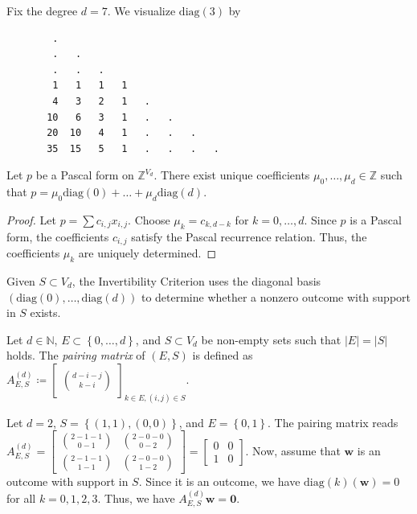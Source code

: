 \begin{example}
    Fix the degree \( d = 7 \). We visualize \( \mathrm{diag}(3) \) by
    \begin{verbatim}
        .
        .   .
        .   .   .
        1   1   1   1
        4   3   2   1   .
       10   6   3   1   .   .
       20  10   4   1   .   .   . 
       35  15   5   1   .   .   .   .
    \end{verbatim}
\end{example}

\begin{proposition}
    Let \( p \) be a Pascal form on \( \mathbb Z^{V_d} \). There exist unique coefficients \( \mu_0, \dots, \mu_d \in \mathbb{Z} \) such that 
    \( p = \mu_0 \mathrm{diag}(0) + \dots + \mu_d \mathrm{diag}(d) \).
\end{proposition}

\begin{proof}
    Let \( p = \sum c_{i,j}x_{i,j} \). Choose \( \mu_k = c_{k,d-k} \) for \( k=0, \dots, d \). Since \( p \) is a Pascal form, the coefficients \( c_{i,j} \) satisfy the Pascal recurrence relation. Thus, the coefficients \( \mu_k \) are uniquely determined.
\end{proof}

Given \( S \subset V_d \), the Invertibility Criterion uses the diagonal basis \( (\mathrm{diag}(0), \dots, \mathrm{diag}(d)) \) to determine whether a nonzero outcome with support in \( S \) exists.

\begin{definition}\label{def:pairing-matrix}
    Let \( d \in \mathbb{N} \), \( E \subset \left\{ 0, \dots, d \right\} \), and \( S \subset V_d \) be non-empty sets such that \( \lvert E \rvert = \lvert S \rvert \) holds. The \emph{pairing matrix} of \( (E,S) \) is defined as \( A^{(d)}_{E,S} \coloneqq \begin{bmatrix} \binom{d-i-j}{k-i} \end{bmatrix}_{k \in E, (i,j) \in S} \).
\end{definition}

\begin{example}
    Let \( d = 2 \), \( S = \left\{ (1,1), (0,0) \right\} \), and \( E = \left\{ 0,1 \right\} \). The pairing matrix reads \(  A^{(d)}_{E,S}  = \begin{bmatrix}
        \binom{2-1-1}{0-1} & \binom{2-0-0}{0-2} \\
        \binom{2-1-1}{1-1}  & \binom{2-0-0}{1-2}
    \end{bmatrix} = \begin{bmatrix}
        0 & 0 \\
        1 & 0
    \end{bmatrix} \). Now, assume that \( \mathbf{w} \) is an outcome with support in \( S \). Since it is an outcome, we have \( \mathrm{diag}(k)(\mathbf{w}) = 0 \) for all \( k = 0, 1,2,3 \). Thus, we have \(  A^{(d)}_{E,S} \mathbf w = \mathbf 0 \).
\end{example}

